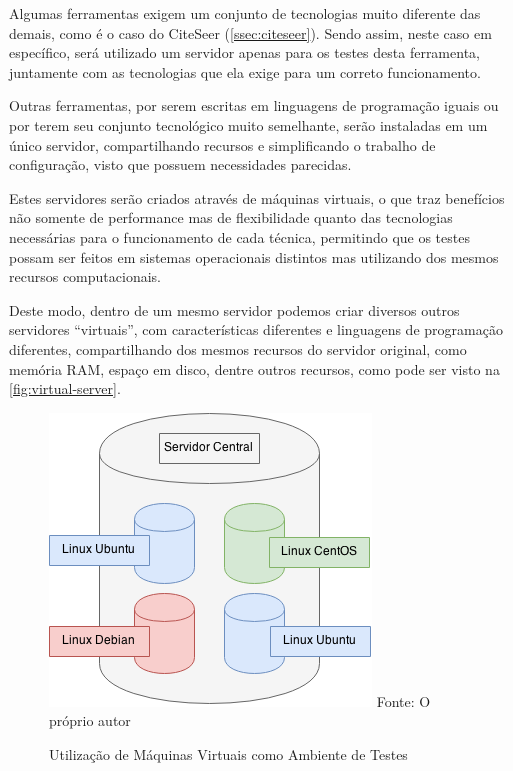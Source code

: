 Algumas ferramentas exigem um conjunto de tecnologias muito diferente das demais, como é o caso do CiteSeer (\autoref{ssec:citeseer}). Sendo assim, neste caso em específico, será utilizado um servidor apenas para os testes desta ferramenta, juntamente com as tecnologias que ela exige para um correto funcionamento. 

Outras ferramentas, por serem escritas em linguagens de programação iguais ou por terem seu conjunto tecnológico muito semelhante, serão instaladas em um único servidor, compartilhando recursos e simplificando o trabalho de configuração, visto que possuem necessidades parecidas.

Estes servidores serão criados através de máquinas virtuais, o que traz benefícios não somente de performance mas de flexibilidade quanto das tecnologias necessárias para o funcionamento de cada técnica, permitindo que os testes possam ser feitos em sistemas operacionais distintos mas utilizando dos mesmos recursos computacionais.

Deste modo, dentro de um mesmo servidor podemos criar diversos outros servidores ``virtuais'', com características diferentes e linguagens de programação diferentes, compartilhando dos mesmos recursos do servidor original, como memória RAM, espaço em disco, dentre outros recursos, como pode ser visto na \autoref{fig:virtual-server}.

\begin{figure}
    \centering
    \caption{Utilização de Máquinas Virtuais como Ambiente de Testes}
    \label{fig:virtual-server}
    \includegraphics[width=0.5\linewidth]{./assets/images/virtual-server}
    \center\footnotesize{Fonte: O próprio autor}
\end{figure}


